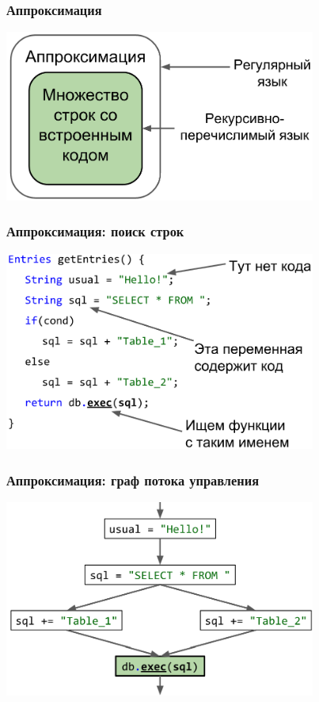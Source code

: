 \documentclass{beamer}
\begin{document}
\begin{frame}[fragile]
	\transwipe[direction=90]
	\frametitle{Аппроксимация}
	\begin{center}
		\includegraphics[width=290pt]{pictures/approximation.png}
	\end{center}
\end{frame}

\begin{frame}[fragile]
	\transwipe[direction=90]
	\frametitle{Аппроксимация: поиск строк}
	\begin{center}
            \includegraphics[width=290pt]{pictures/approximation_strings.png}
        \end{center}
\end{frame}

\begin{frame}[fragile]
	\transwipe[direction=90]
	\frametitle{Аппроксимация: граф потока управления}
	\begin{center}
            \includegraphics[width=290pt]{pictures/approximation_cfg.png}
        \end{center}
\end{frame}
\end{document}
